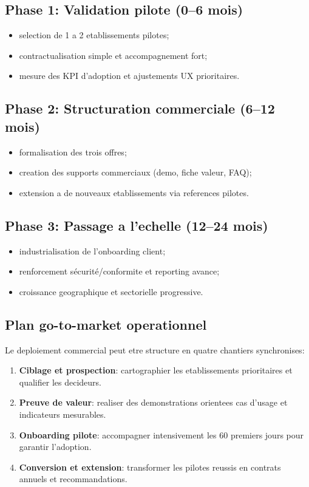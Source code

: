 \documentclass[12pt,a4paper,oneside]{report}
\begin{document}
\subsection{Phase 1: Validation pilote (0--6 mois)}

\begin{itemize}
  \item selection de 1 a 2 etablissements pilotes;
  \item contractualisation simple et accompagnement fort;
  \item mesure des KPI d'adoption et ajustements UX prioritaires.
\end{itemize}

\subsection{Phase 2: Structuration commerciale (6--12 mois)}

\begin{itemize}
  \item formalisation des trois offres;
  \item creation des supports commerciaux (demo, fiche valeur, FAQ);
  \item extension a de nouveaux etablissements via references pilotes.
\end{itemize}

\subsection{Phase 3: Passage a l'echelle (12--24 mois)}

\begin{itemize}
  \item industrialisation de l'onboarding client;
  \item renforcement sécurité/conformite et reporting avance;
  \item croissance geographique et sectorielle progressive.
\end{itemize}

\subsection{Plan go-to-market operationnel}

Le deploiement commercial peut etre structure en quatre chantiers synchronises:
\begin{enumerate}
  \item \textbf{Ciblage et prospection}: cartographier les etablissements prioritaires et qualifier les decideurs.
  \item \textbf{Preuve de valeur}: realiser des demonstrations orientees cas d'usage et indicateurs mesurables.
  \item \textbf{Onboarding pilote}: accompagner intensivement les 60 premiers jours pour garantir l'adoption.
  \item \textbf{Conversion et extension}: transformer les pilotes reussis en contrats annuels et recommandations.
\end{enumerate}
\end{document}
